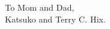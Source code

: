 
\begin{dedication}
\null\vfil
{\large
\begin{center}
To Mom and Dad,\\\vspace{12pt}
Katsuko and Terry C. Hix.\\\vspace{12pt}
\end{center}}
\vfil\null
\end{dedication}
